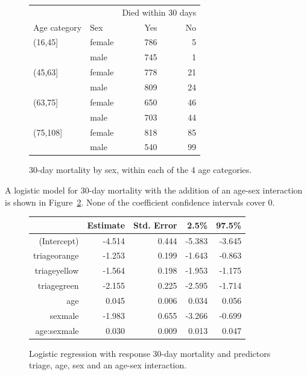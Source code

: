 \begin{figure}[ht]
\centering
\begin{tabular}{llrr}
  \hline
    & & \multicolumn{2}{c}{Died within 30 days}   \\
Age category & Sex & Yes & No \\
\hline
(16,45] & female  &    786 &  5 \\
        & male    &    745 &  1 \\
(45,63] & female  &    778 & 21 \\
        & male    &    809 & 24 \\
(63,75] & female  &    650 & 46 \\
        & male    &    703 &  44 \\
(75,108] & female &     818 & 85 \\
         & male   &     540 & 99 \\
\hline
\end{tabular}
\caption{30-day mortality by sex, within each of the 4 age categories.}
\label{figure:mort30SexWithinAgeGroupTable}
\end{figure}

A logistic model for 30-day mortality with the addition of an age-sex interaction is shown in Figure~\ref{figure:triageAgeSexInteractionMort30logreg}.  None of the coefficient confidence intervals cover 0.

\begin{figure}[ht]
\centering
\begin{tabular}{rrrrr}
  \hline
  & Estimate & Std. Error & 2.5\% & 97.5\%  \\
  \hline
  (Intercept) & -4.514 & 0.444 & -5.383 & -3.645\\
  triageorange & -1.253 & 0.199 & -1.643 & -0.863 \\
  triageyellow & -1.564 & 0.198 & -1.953 & -1.175  \\
  triagegreen & -2.155 & 0.225 & -2.595 & -1.714 \\
  age & 0.045 & 0.006 & 0.034 & 0.056  \\
  sexmale & -1.983 & 0.655 & -3.266 & -0.699  \\
  age:sexmale & 0.030 & 0.009 & 0.013 & 0.047  \\
   \hline
\end{tabular}
\caption{Logistic regression with response 30-day mortality and
       predictors triage, age, sex and an age-sex interaction.}
\label{figure:triageAgeSexInteractionMort30logreg}
\end{figure}

